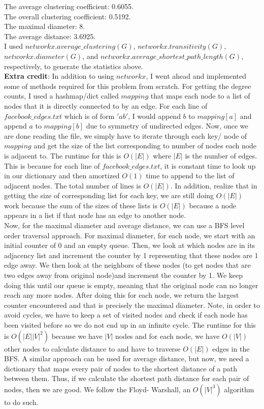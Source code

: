 \documentclass[12 pt]{article}
\begin{document}
	\noindent The average clustering coefficient: 0.6055. \\
	\noindent The overall clustering coefficient: 0.5192. \\
	\noindent The maximal diameter: 8. \\
	\noindent The average distance: 3.6925. \\
	
	\noindent I used $networkx.average\_clustering(G)$, $networkx.transitivity(G)$, $networkx.diameter(G)$, and $networkx.average\_shortest\_path\_length(G)$, respectively, to generate the statistics above.\\
	
	\noindent \textbf{Extra credit}: In addition to using $networkx$, I went ahead and implemented some of methods required for this problem from scratch. For getting the degree counts, I used a hashmap/dict called $mapping$ that maps each node to a list of nodes that it is directly connected to by an edge. For each line of $facebook\_edges.txt$ which is of form $'a b'$, I would append $b$ to $mapping[a]$ and append $a$ to $mapping[b]$ due to symmetry of undirected edges. Now, once we are done reading the file, we simply have to iterate through each key/ node of $mapping$ and get the size of the list corresponding to number of nodes each node is adjacent to. The runtime for this is $O(|E|)$ where $|E|$ is the number of edges. This is because for each line of $facebook\_edges.txt$, it is constant time to look up in our dictionary and then amortized $O(1)$ time to append to the list of adjacent nodes. The total number of lines is $O(|E|)$. In addition, realize that in getting the size of corresponding list for each key, we are still doing $O(|E|)$ work because the sum of the sizes of these lists is $O(|E|)$ because a node appears in a list if that node has an edge to another node. \\
	
	\noindent Now, for the maximal diameter and average distance, we can use a BFS level order traversal approach. For maximal diameter, for each node, we start with an initial counter of 0 and an empty queue. Then, we look at which nodes are in its adjacency list and increment the counter by 1 representing that these nodes are 1 edge away. We then look at the neighbors of these nodes (to get nodes that are two edges away from original node)and increment the counter by 1. We keep doing this until our queue is empty, meaning that the original node can no longer reach any more nodes. After doing this for each node, we return the largest counter encountered and that is precisely the maximal diameter. Note, in order to avoid cycles, we have to keep a set of visited nodes and check if each node has been visited before so we do not end up in an infinite cycle. The runtime for this is $O(|E||V|^2)$ because we have $|V|$ nodes and for each node, we have $O(|V|)$ other nodes to calculate distance to and have to traverse $O(|E|)$ edges in the BFS. A similar approach can be used for average distance, but now, we need a dictionary that maps every pair of nodes to the shortest distance of a path between them. Thus, if we calculate the shortest path distance for each pair of nodes, then we are good. We follow the Floyd- Warshall, an $O(|V|^3)$ algorithm to do such. 
\end{document}
